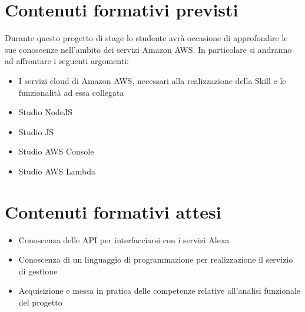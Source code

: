 \section*{Contenuti formativi previsti}
Durante questo progetto di stage lo studente avrà occasione di approfondire le sue conoscenze nell'ambito dei servizi Amazon AWS.
In particolare si andranno ad affrontare i seguenti argomenti:
\begin{itemize}
	\item I servizi cloud di Amazon AWS, necessari alla realizzazione della Skill e le funzionalità ad essa collegata
	\item Studio NodeJS
	\item Studio JS
	\item Studio AWS Console
	\item Studio AWS Lambda
\end{itemize}
\section*{Contenuti formativi attesi}
\begin{itemize}
	\item Conoscenza delle API per interfacciarsi con i servizi Alexa
	\item Conoscenza di un linguaggio di programmazione per realizzazione il servizio di gestione
 	\item Acquisizione e messa in pratica delle competenze relative all'analisi funzionale del progetto
\end{itemize}
\newpage